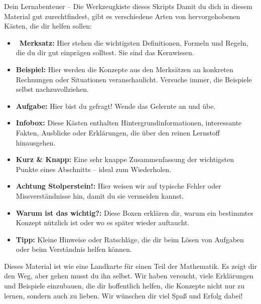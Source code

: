 \begin{infoboxumgebung}{Dein Lernabenteuer – Die Werkzeugkiste dieses Skripts}
Damit du dich in diesem Material gut zurechtfindest, gibt es verschiedene Arten von hervorgehobenen Kästen, die dir helfen sollen:
\begin{itemize}
    \item \lightning\, \textbf{Merksatz:} Hier stehen die wichtigsten Definitionen, Formeln und Regeln, die du dir gut einprägen solltest. Sie sind das Kernwissen.
    \item {} \textbf{Beispiel:} Hier werden die Konzepte aus den Merksätzen an konkreten Rechnungen oder Situationen veranschaulicht. Versuche immer, die Beispiele selbst nachzuvollziehen.
    \item {} \textbf{Aufgabe:} Hier bist du gefragt! Wende das Gelernte an und übe.
    \item {} \textbf{Infobox:} Diese Kästen enthalten Hintergrundinformationen, interessante Fakten, Ausblicke oder Erklärungen, die über den reinen Lernstoff hinausgehen.
    \item {} \textbf{Kurz \& Knapp:} Eine sehr knappe Zusammenfassung der wichtigsten Punkte eines Abschnitts – ideal zum Wiederholen.
    \item {} \textbf{Achtung Stolperstein!:} Hier weisen wir auf typische Fehler oder Missverständnisse hin, damit du sie vermeiden kannst.
    \item {} \textbf{Warum ist das wichtig?:} Diese Boxen erklären dir, warum ein bestimmtes Konzept nützlich ist oder wo es später wieder auftaucht.
    \item {} \textbf{Tipp:} Kleine Hinweise oder Ratschläge, die dir beim Lösen von Aufgaben oder beim Verständnis helfen können.
\end{itemize}
\end{infoboxumgebung}
Dieses Material ist wie eine Landkarte für einen Teil der Mathematik. Es zeigt dir den Weg, aber gehen musst du ihn selbst. Wir haben versucht, viele Erklärungen und Beispiele einzubauen, die dir hoffentlich helfen, die Konzepte nicht nur zu lernen, sondern auch zu lieben. Wir wünschen dir viel Spaß und Erfolg dabei!
\newpage
